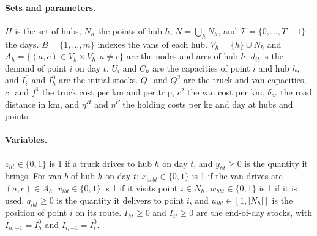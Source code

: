 \documentclass[11pt,a4paper]{article}
\begin{document}
\paragraph{Sets and parameters.}
$H$ is the set of hubs, $N_h$ the points of hub $h$, $N = \bigcup_h N_h$, and
$\mathcal{T} = \{0,\dots,T-1\}$ the days. $B = \{1,\dots,m\}$ indexes the vans of each hub.
$V_h = \{h\} \cup N_h$ and $A_h = \{(a,c) \in V_h \times V_h : a \ne c\}$ are the nodes and arcs
of hub $h$. $d_{it}$ is the demand of point $i$ on day $t$, $U_i$ and $C_h$ are the capacities of
point $i$ and hub $h$, and $I^0_i$ and $I^0_h$ are the initial stocks. $Q^1$ and $Q^2$ are the truck
and van capacities, $c^1$ and $f^1$ the truck cost per km and per trip, $c^2$ the van cost per km,
$\delta_{ac}$ the road distance in km, and $\eta^H$ and $\eta^P$ the holding costs per kg and day at
hubs and points.

\paragraph{Variables.}
$z_{ht} \in \{0,1\}$ is 1 if a truck drives to hub $h$ on day $t$, and $y_{ht} \ge 0$ is the
quantity it brings. For van $b$ of hub $h$ on day $t$: $x_{acbt} \in \{0,1\}$ is 1 if the van
drives arc $(a,c) \in A_h$, $v_{ibt} \in \{0,1\}$ is 1 if it visits point $i \in N_h$,
$w_{hbt} \in \{0,1\}$ is 1 if it is used, $q_{ibt} \ge 0$ is the quantity it delivers to point
$i$, and $u_{ibt} \in [1, |N_h|]$ is the position of point $i$ on its route. $I_{ht} \ge 0$ and
$I_{it} \ge 0$ are the end-of-day stocks, with $I_{h,-1} = I^0_h$ and $I_{i,-1} = I^0_i$.
\end{document}
